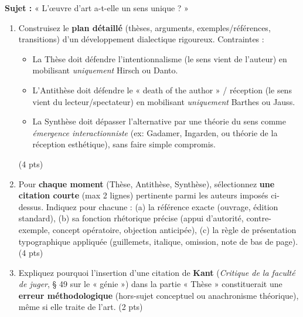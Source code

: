 \documentclass[11pt]{article}
\begin{document}
\begin{exercice}
\textbf{Sujet :} « L'œuvre d'art a-t-elle un sens unique ? »

\begin{enumerate}
    \item Construisez le \textbf{plan détaillé} (thèses, arguments, exemples/références, transitions) d'un développement dialectique rigoureux. Contraintes :
    \begin{itemize}
        \item La Thèse doit défendre l'intentionnalisme (le sens vient de l'auteur) en mobilisant \textit{uniquement} Hirsch ou Danto.
        \item L'Antithèse doit défendre le « death of the author » / réception (le sens vient du lecteur/spectateur) en mobilisant \textit{uniquement} Barthes ou Jauss.
        \item La Synthèse doit dépasser l'alternative par une théorie du sens comme \textit{émergence interactionniste} (ex: Gadamer, Ingarden, ou théorie de la réception esthétique), sans faire simple compromis.
    \end{itemize}
    (4 pts)
    \item Pour \textbf{chaque moment} (Thèse, Antithèse, Synthèse), sélectionnez \textbf{une citation courte} (max 2 lignes) pertinente parmi les auteurs imposés ci-dessus. Indiquez pour chacune : (a) la référence exacte (ouvrage, édition standard), (b) sa fonction rhétorique précise (appui d'autorité, contre-exemple, concept opératoire, objection anticipée), (c) la règle de présentation typographique appliquée (guillemets, italique, omission, note de bas de page). (4 pts)
    \item Expliquez pourquoi l'insertion d'une citation de \textbf{Kant} (\textit{Critique de la faculté de juger}, § 49 sur le « génie ») dans la partie « Thèse » constituerait une \textbf{erreur méthodologique} (hors-sujet conceptuel ou anachronisme théorique), même si elle traite de l'art. (2 pts)
\end{enumerate}
\end{exercice}
\end{document}
